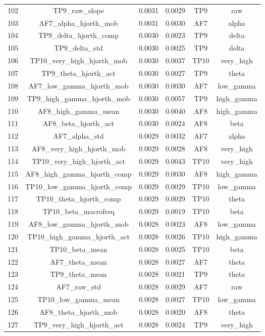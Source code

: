 \begin{table}[hptb]
\begin{table}
\begin{tabular}{cccccc}
102 & TP9_raw_slope & 0.0031 & 0.0029 & TP9 & raw \\
103 & AF7_alpha_hjorth_mob & 0.0031 & 0.0030 & AF7 & alpha \\
104 & TP9_delta_hjorth_comp & 0.0030 & 0.0023 & TP9 & delta \\
105 & TP9_delta_std & 0.0030 & 0.0025 & TP9 & delta \\
106 & TP10_very_high_hjorth_mob & 0.0030 & 0.0037 & TP10 & very_high \\
107 & TP9_theta_hjorth_act & 0.0030 & 0.0027 & TP9 & theta \\
108 & AF7_low_gamma_hjorth_mob & 0.0030 & 0.0030 & AF7 & low_gamma \\
109 & TP9_high_gamma_hjorth_mob & 0.0030 & 0.0057 & TP9 & high_gamma \\
110 & AF8_high_gamma_mean & 0.0030 & 0.0040 & AF8 & high_gamma \\
111 & AF8_beta_hjorth_act & 0.0030 & 0.0024 & AF8 & beta \\
112 & AF7_alpha_std & 0.0029 & 0.0032 & AF7 & alpha \\
113 & AF8_very_high_hjorth_mob & 0.0029 & 0.0028 & AF8 & very_high \\
114 & TP10_very_high_hjorth_act & 0.0029 & 0.0043 & TP10 & very_high \\
115 & AF8_high_gamma_hjorth_comp & 0.0029 & 0.0030 & AF8 & high_gamma \\
116 & TP10_low_gamma_hjorth_comp & 0.0029 & 0.0029 & TP10 & low_gamma \\
117 & TP10_theta_hjorth_comp & 0.0029 & 0.0029 & TP10 & theta \\
118 & TP10_beta_macrofreq & 0.0029 & 0.0019 & TP10 & beta \\
119 & AF8_low_gamma_hjorth_mob & 0.0028 & 0.0023 & AF8 & low_gamma \\
120 & TP10_high_gamma_hjorth_act & 0.0028 & 0.0026 & TP10 & high_gamma \\
121 & TP10_beta_mean & 0.0028 & 0.0025 & TP10 & beta \\
122 & AF7_theta_mean & 0.0028 & 0.0027 & AF7 & theta \\
123 & TP9_theta_mean & 0.0028 & 0.0021 & TP9 & theta \\
124 & AF7_raw_std & 0.0028 & 0.0029 & AF7 & raw \\
125 & TP10_low_gamma_mean & 0.0028 & 0.0027 & TP10 & low_gamma \\
126 & AF8_theta_hjorth_mob & 0.0028 & 0.0020 & AF8 & theta \\
127 & TP9_very_high_hjorth_act & 0.0028 & 0.0024 & TP9 & very_high \\

\end{tabular}
\end{table}
\end{table}
